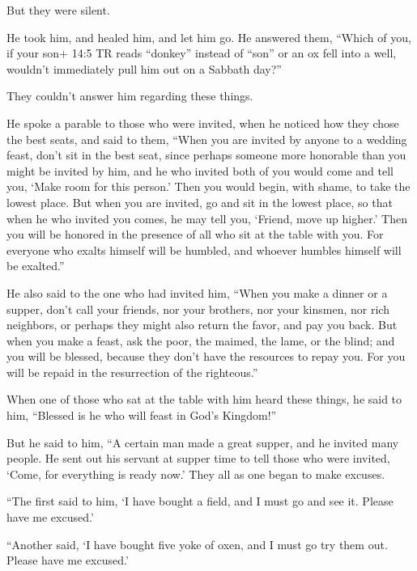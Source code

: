  But they were silent.

He took him, and healed him, and let him go.  He answered
them, ``Which of you, if your son+ 14:5 TR reads ``donkey'' instead of
``son'' or an ox fell into a well, wouldn't immediately pull him out on
a Sabbath day?''

 They couldn't answer him regarding these things.

 He spoke a parable to those who were invited, when he
noticed how they chose the best seats, and said to them, 
``When you are invited by anyone to a wedding feast, don't sit in the
best seat, since perhaps someone more honorable than you might be
invited by him,  and he who invited both of you would come
and tell you, `Make room for this person.' Then you would begin, with
shame, to take the lowest place.  But when you are invited,
go and sit in the lowest place, so that when he who invited you comes,
he may tell you, `Friend, move up higher.' Then you will be honored in
the presence of all who sit at the table with you.  For
everyone who exalts himself will be humbled, and whoever humbles himself
will be exalted.''

 He also said to the one who had invited him, ``When you
make a dinner or a supper, don't call your friends, nor your brothers,
nor your kinsmen, nor rich neighbors, or perhaps they might also return
the favor, and pay you back.  But when you make a feast,
ask the poor, the maimed, the lame, or the blind;  and you
will be blessed, because they don't have the resources to repay you. For
you will be repaid in the resurrection of the righteous.''

 When one of those who sat at the table with him heard
these things, he said to him, ``Blessed is he who will feast in God's
Kingdom!''

 But he said to him, ``A certain man made a great supper,
and he invited many people.  He sent out his servant at
supper time to tell those who were invited, `Come, for everything is
ready now.'  They all as one began to make excuses.

``The first said to him, `I have bought a field, and I must go and see
it. Please have me excused.'

 ``Another said, `I have bought five yoke of oxen, and I
must go try them out. Please have me excused.'

